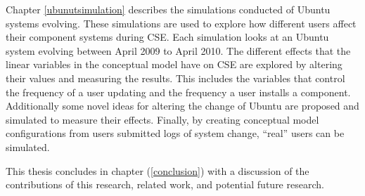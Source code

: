 Chapter \ref{ubunutsimulation} describes the simulations conducted of Ubuntu systems evolving.
These simulations are used to explore how different users affect their component systems during CSE.
Each simulation looks at an Ubuntu system evolving between April 2009 to April 2010.
The different effects that the linear variables in the conceptual model have on CSE are explored by altering their values and measuring the results.
This includes the variables that control the frequency of a user updating and the frequency a user installs a component. 
Additionally some novel ideas for altering the change of Ubuntu are proposed and simulated to measure their effects.
Finally, by creating conceptual model configurations from users submitted logs of system change, ``real'' users can be simulated.

This thesis concludes in chapter (\ref{conclusion}) with a discussion of the contributions of this research, related work, and potential future research.
